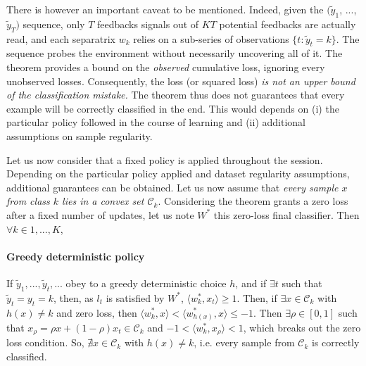 \documentclass[preprint,12pt,authoryear]{elsarticle}
\begin{document}
There is however an important caveat to be mentioned. 
Indeed, given the  $ (\tilde{y}_1$, ..., $\tilde{y}_T)$ sequence, only $T$ feedbacks signals out of $KT$ potential feedbacks are actually read,
and each separatrix $w_k$ relies on a sub-series of observations $\{t: \tilde{y}_t = k\}$.
The sequence probes the environment without necessarily uncovering all of it. The theorem provides a bound on the \emph{observed} cumulative loss, ignoring every unobserved losses. 
Consequently, the loss (or squared loss) \emph{is not an upper bound of the classification mistake.} The theorem thus does not guarantees that every example will be correctly classified in the end. This would depends on (i) the particular policy followed in the course of learning and (ii)  additional assumptions on sample regularity.   

Let us now consider  that a fixed policy is applied throughout the session. Depending on the particular policy applied and dataset regularity assumptions, additional guarantees can be obtained. Let us now assume that \emph{every sample $x$ from class $k$ lies in a convex set $\mathcal{C}_k$}. 
Considering the theorem grants a zero loss after a fixed number of updates, let us note  $W^*$ this zero-loss final classifier. Then $\forall k \in 1,...,K$, 




	\paragraph{Greedy deterministic policy} If $\tilde{y}_1, ...,\tilde{y}_t, ...$ obey to a greedy deterministic choice $h$, and if $\exists t$ such that $\tilde{y}_t = y_t = k$, then, as $l_t$ is satisfied by $W^*$, $\langle w_k^*, x_t\rangle \geq 1$.  Then, if $\exists x \in \mathcal{C}_k$ with $h(x) \neq k$ and zero loss, then $\langle w_k^*, x\rangle < \langle w_{h(x)}^*, x\rangle \leq -1$. Then $\exists \rho \in [0,1]$ such that $x_\rho = \rho x + (1-\rho) x_t \in \mathcal{C}_k$ and 
	$-1 < \langle w_k^*,x_\rho \rangle < 1 $, which breaks out the zero loss condition. So, $\nexists x \in \mathcal{C}_k$ with $h(x) \neq k$, i.e. every sample from $\mathcal{C}_k$ is correctly classified.
\end{document}
